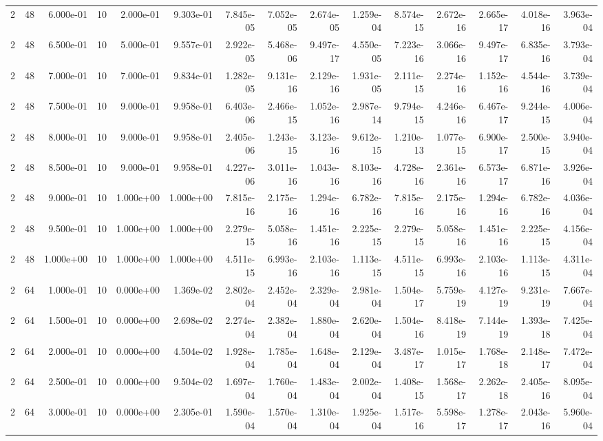 \begin{tabular}{rrrrrrrrrrrrrrr}
2 & 48 & 6.000e-01 & 10 & 2.000e-01 & 9.303e-01 & 7.845e-05 & 7.052e-05 & 2.674e-05 & 1.259e-04 & 8.574e-15 & 2.672e-16 & 2.665e-17 & 4.018e-16 & 3.963e-04 \\
2 & 48 & 6.500e-01 & 10 & 5.000e-01 & 9.557e-01 & 2.922e-05 & 5.468e-06 & 9.497e-17 & 4.550e-05 & 7.223e-16 & 3.066e-16 & 9.497e-17 & 6.835e-16 & 3.793e-04 \\
2 & 48 & 7.000e-01 & 10 & 7.000e-01 & 9.834e-01 & 1.282e-05 & 9.131e-16 & 2.129e-16 & 1.931e-05 & 2.111e-15 & 2.274e-16 & 1.152e-16 & 4.544e-16 & 3.739e-04 \\
2 & 48 & 7.500e-01 & 10 & 9.000e-01 & 9.958e-01 & 6.403e-06 & 2.466e-15 & 1.052e-16 & 2.987e-14 & 9.794e-15 & 4.246e-16 & 6.467e-17 & 9.244e-15 & 4.006e-04 \\
2 & 48 & 8.000e-01 & 10 & 9.000e-01 & 9.958e-01 & 2.405e-06 & 1.243e-15 & 3.123e-16 & 9.612e-15 & 1.210e-13 & 1.077e-15 & 6.900e-17 & 2.500e-15 & 3.940e-04 \\
2 & 48 & 8.500e-01 & 10 & 9.000e-01 & 9.958e-01 & 4.227e-06 & 3.011e-16 & 1.043e-16 & 8.103e-16 & 4.728e-16 & 2.361e-16 & 6.573e-17 & 6.871e-16 & 3.926e-04 \\
2 & 48 & 9.000e-01 & 10 & 1.000e+00 & 1.000e+00 & 7.815e-16 & 2.175e-16 & 1.294e-16 & 6.782e-16 & 7.815e-16 & 2.175e-16 & 1.294e-16 & 6.782e-16 & 4.036e-04 \\
2 & 48 & 9.500e-01 & 10 & 1.000e+00 & 1.000e+00 & 2.279e-15 & 5.058e-16 & 1.451e-16 & 2.225e-15 & 2.279e-15 & 5.058e-16 & 1.451e-16 & 2.225e-15 & 4.156e-04 \\
2 & 48 & 1.000e+00 & 10 & 1.000e+00 & 1.000e+00 & 4.511e-15 & 6.993e-16 & 2.103e-16 & 1.113e-15 & 4.511e-15 & 6.993e-16 & 2.103e-16 & 1.113e-15 & 4.311e-04 \\
2 & 64 & 1.000e-01 & 10 & 0.000e+00 & 1.369e-02 & 2.802e-04 & 2.452e-04 & 2.329e-04 & 2.981e-04 & 1.504e-17 & 5.759e-19 & 4.127e-19 & 9.231e-19 & 7.667e-04 \\
2 & 64 & 1.500e-01 & 10 & 0.000e+00 & 2.698e-02 & 2.274e-04 & 2.382e-04 & 1.880e-04 & 2.620e-04 & 1.504e-16 & 8.418e-19 & 7.144e-19 & 1.393e-18 & 7.425e-04 \\
2 & 64 & 2.000e-01 & 10 & 0.000e+00 & 4.504e-02 & 1.928e-04 & 1.785e-04 & 1.648e-04 & 2.129e-04 & 3.487e-17 & 1.015e-17 & 1.768e-18 & 2.148e-17 & 7.472e-04 \\
2 & 64 & 2.500e-01 & 10 & 0.000e+00 & 9.504e-02 & 1.697e-04 & 1.760e-04 & 1.483e-04 & 2.002e-04 & 1.408e-15 & 1.568e-17 & 2.262e-18 & 2.405e-16 & 8.095e-04 \\
2 & 64 & 3.000e-01 & 10 & 0.000e+00 & 2.305e-01 & 1.590e-04 & 1.570e-04 & 1.310e-04 & 1.925e-04 & 1.517e-16 & 5.598e-17 & 1.278e-17 & 2.043e-16 & 5.960e-04 \\

\end{tabular}
